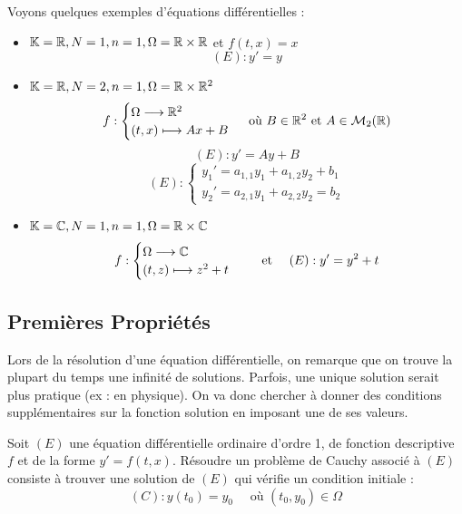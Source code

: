 \begin{example}
    Voyons quelques exemples d'équations différentielles : 
    \begin{itemize}
        \item $\mathbb{K} = \mathbb{R}, N = 1, n = 1, \Omega = \mathbb{R} \times \mathbb{R}$ et $f(t,x) = x $ 
            \[ (E) : y' = y \] 
        \item $\mathbb{K} = \mathbb{R}, N = 2, n = 1, \Omega = \mathbb{R} \times \mathbb{R}^2$
            \[ f : 
                \begin{cases}
                    \Omega \longrightarrow \mathbb{R}^2 \\ 
                    (t,x) \longmapsto Ax + B 
                \end{cases}
                \text{ où } B \in \mathbb{R}^2 \text{ et } A \in \mathcal{M}_2(\mathbb{R}) \] 
            \[ (E) : y' = Ay + B \] 
            \[ (E) : 
                \begin{cases}
                    y_1' = a_{1,1}y_1 + a_{1,2}y_2 + b_1 \\ 
                    y_2' = a_{2,1}y_1 + a_{2,2}y_2 = b_2
                \end{cases}
            \]
        \item $\mathbb{K} = \mathbb{C}, N = 1, n = 1, \Omega = \mathbb{R} \times \mathbb{C}$ 
            \[ f : 
                \begin{cases}
                    \Omega \longrightarrow \mathbb{C} \\ 
                    (t,z) \longmapsto z^2 + t 
                \end{cases}
                \quad \text{ et } \quad 
                (E) : y' = y^2 + t 
            \]
    \end{itemize}
\end{example}

\subsection{Premières Propriétés}

Lors de la résolution d'une équation différentielle, on remarque que on trouve la plupart du temps une infinité de 
solutions. Parfois, une unique solution serait plus pratique (ex : en physique). On va donc chercher à donner des 
conditions supplémentaires sur la fonction solution en imposant une de ses valeurs. 

\begin{definition}
    Soit $(E)$ une équation différentielle ordinaire d'ordre 1, de fonction descriptive $f$ et de la forme $y' = f(t,x)$. 
    Résoudre un problème de Cauchy associé à $(E)$ consiste à trouver une solution de $(E)$ qui vérifie un condition initiale : 
    \[ (C) : y(t_0) = y_0 \quad \text{ où } (t_0,y_0) \in \Omega \] 
\end{definition}

